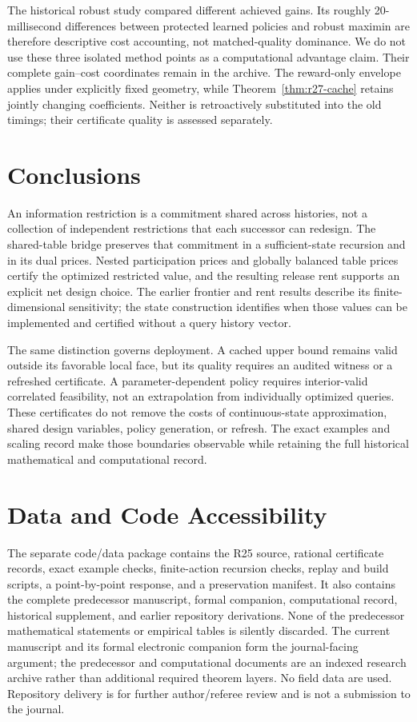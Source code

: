 \documentclass[11pt,letterpaper]{article}
\theoremstyle{definition}\newtheorem{assumption}[theorem]{Assumption}
\begin{document}
The historical robust study compared different achieved gains. Its roughly 20-millisecond differences between protected learned policies and robust maximin are therefore descriptive cost accounting, not matched-quality dominance. We do not use these three isolated method points as a computational advantage claim. Their complete gain--cost coordinates remain in the archive. The reward-only envelope applies under explicitly fixed geometry, while Theorem~\ref{thm:r27-cache} retains jointly changing coefficients. Neither is retroactively substituted into the old timings; their certificate quality is assessed separately.

\section{Conclusions}
An information restriction is a commitment shared across histories, not a collection of independent restrictions that each successor can redesign. The shared-table bridge preserves that commitment in a sufficient-state recursion and in its dual prices. Nested participation prices and globally balanced table prices certify the optimized restricted value, and the resulting release rent supports an explicit net design choice. The earlier frontier and rent results describe its finite-dimensional sensitivity; the state construction identifies when those values can be implemented and certified without a query history vector.

The same distinction governs deployment. A cached upper bound remains valid outside its favorable local face, but its quality requires an audited witness or a refreshed certificate. A parameter-dependent policy requires interior-valid correlated feasibility, not an extrapolation from individually optimized queries. These certificates do not remove the costs of continuous-state approximation, shared design variables, policy generation, or refresh. The exact examples and scaling record make those boundaries observable while retaining the full historical mathematical and computational record.

\section*{Data and Code Accessibility}
The separate code/data package contains the R25 source, rational certificate records, exact example checks, finite-action recursion checks, replay and build scripts, a point-by-point response, and a preservation manifest. It also contains the complete predecessor manuscript, formal companion, computational record, historical supplement, and earlier repository derivations. None of the predecessor mathematical statements or empirical tables is silently discarded. The current manuscript and its formal electronic companion form the journal-facing argument; the predecessor and computational documents are an indexed research archive rather than additional required theorem layers. No field data are used. Repository delivery is for further author/referee review and is not a submission to the journal.
\end{document}
